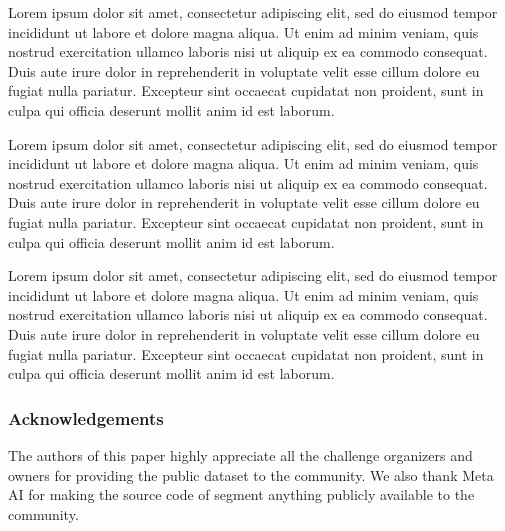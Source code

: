 \documentclass[runningheads]{llncs}
\begin{document}
{\color{red} 
Lorem ipsum dolor sit amet, consectetur adipiscing elit, sed do eiusmod tempor incididunt ut labore et dolore magna aliqua. Ut enim ad minim veniam, quis nostrud exercitation ullamco laboris nisi ut aliquip ex ea commodo consequat. Duis aute irure dolor in reprehenderit in voluptate velit esse cillum dolore eu fugiat nulla pariatur. Excepteur sint occaecat cupidatat non proident, sunt in culpa qui officia deserunt mollit anim id est laborum.

Lorem ipsum dolor sit amet, consectetur adipiscing elit, sed do eiusmod tempor incididunt ut labore et dolore magna aliqua. Ut enim ad minim veniam, quis nostrud exercitation ullamco laboris nisi ut aliquip ex ea commodo consequat. Duis aute irure dolor in reprehenderit in voluptate velit esse cillum dolore eu fugiat nulla pariatur. Excepteur sint occaecat cupidatat non proident, sunt in culpa qui officia deserunt mollit anim id est laborum.

Lorem ipsum dolor sit amet, consectetur adipiscing elit, sed do eiusmod tempor incididunt ut labore et dolore magna aliqua. Ut enim ad minim veniam, quis nostrud exercitation ullamco laboris nisi ut aliquip ex ea commodo consequat. Duis aute irure dolor in reprehenderit in voluptate velit esse cillum dolore eu fugiat nulla pariatur. Excepteur sint occaecat cupidatat non proident, sunt in culpa qui officia deserunt mollit anim id est laborum.
}




\subsubsection{Acknowledgements} 
The authors of this paper highly appreciate all the challenge organizers and owners for providing the public dataset to the community. We also thank Meta AI for making the source code of segment anything publicly available to the community. 

%
\newpage


\end{document}
